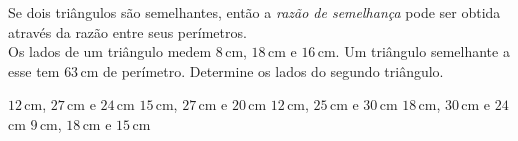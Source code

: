 Se dois triângulos são semelhantes, então a \textit{razão de semelhança} pode ser obtida através da razão entre seus perímetros.\\
Os lados de um triângulo medem $8$\,cm, $18$\,cm e $16$\,cm. Um triângulo semelhante a esse tem $63$\,cm de perímetro. Determine os lados do segundo triângulo.

$12$\,cm, $27$\,cm e $24$\,cm
$15$\,cm, $27$\,cm e $20$\,cm
$12$\,cm, $25$\,cm e $30$\,cm
$18$\,cm, $30$\,cm e $24$\,cm
$9$\,cm, $18$\,cm e $15$\,cm



